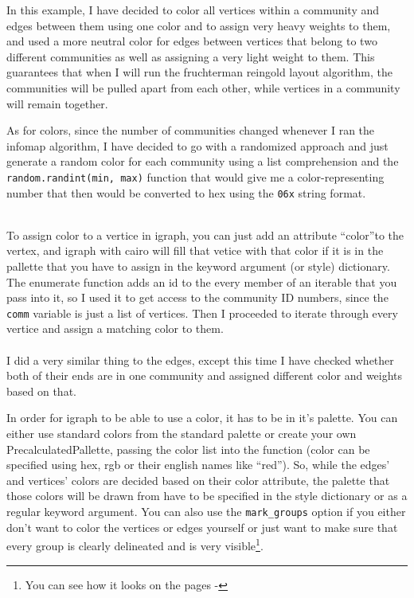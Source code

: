 \documentclass[12pt, a4paper]{article}
\begin{document}
In this example, I have decided to color all vertices within a community and edges between them using one color and to assign very heavy weights to them, and used a more neutral color for edges between vertices that belong to two different communities as well as assigning a very light weight to them. This guarantees that when I will run the fruchterman reingold layout algorithm, the communities will be pulled apart from each other, while vertices in a community will remain together.

As for colors, since the number of communities changed whenever I ran the infomap algorithm, I have decided to go with a randomized approach and just generate a random color for each community using a list comprehension and the \texttt{random.randint(min, max)} function that would give me a color-representing number that then would be converted to hex using the \texttt{06x} string format.

\ \\
To assign color to a vertice in igraph, you can just add an attribute \textquotedblleft color\textquotedblright to the vertex, and igraph with cairo will fill that vetice with that color if it is in the pallette that you have to assign in the keyword argument (or style) dictionary. The enumerate function adds an id to the every member of an iterable that you pass into it, so I used it to get access to the community ID numbers, since the \texttt{comm}  variable is just a list of vertices. Then I proceeded to iterate through every vertice and assign a matching color to them.\\

\ \\
I did a very similar thing to the edges, except this time I have checked whether both of their ends are in one community and assigned different color and weights based on that.



In order for igraph to be able to use a color, it has to be in it's palette. You can either use standard colors from the standard palette or create your own PrecalculatedPallette, passing the color list into the function (color can be specified using hex, rgb or their english names like \textquotedblleft red\textquotedblright). So, while the edges' and vertices' colors are decided based on their color attribute, the palette that those colors will be drawn from have to be specified in the style dictionary or as a regular keyword argument. You can also use the \texttt{mark\_groups} option if you either don't want to color the vertices or edges yourself or just want to make sure that every group is clearly delineated and is very visible\footnote{You can see how it looks on the pages \pageref{fig:hdg_com}-\pageref{fig:hdg_com_marked}}.
\end{document}

